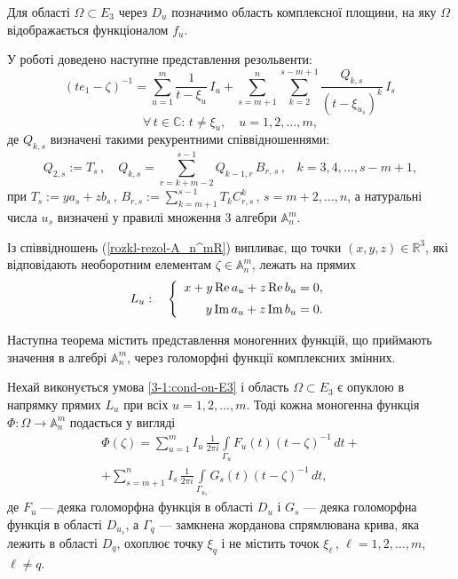 \documentclass[11pt, reqno]{amsart}
\begin{document}
Для області
$\Omega\subset E_3$ через $D_u$ позначимо область комплексної
площини, на яку $\Omega$ відображається функціоналом $f_u$.

У роботі \cite{Sh-co} доведено наступне представлення резольвенти:
\begin{equation}\label{rozkl-rezol-A_n^mR}
(te_1-\zeta)^{-1}=\sum\limits_{u=1}^m\frac{1}{t-\xi_u}\,I_u+
 \sum\limits_{s=m+1}^{n}\sum\limits_{k=2}^{s-m+1}\frac{Q_{k,s}}
 {\left(t-\xi_{u_{s}}\right)^k}\,I_{s}\,
  \end{equation}
  $$ \forall\,t\in\mathbb{C}:\,
t\neq \xi_u,\quad u=1,2,\ldots,m,$$ де $Q_{k,s}$ визначені такими
рекурентними співвідношеннями:
$$
Q_{2,s}:=T_{s}\,,\quad
Q_{k,s}=\sum\limits_{r=k+m-2}^{s-1}Q_{k-1,r}\,B_{r,\,s}\,,\;
\;\;k=3,4,\ldots,s-m+1,
$$
при
$T_s:=ya_s+zb_s$\,, $B_{r,s}:=\sum\limits_{k=m+1}^{s-1}T_k
C_{r,s}^k$\,, $s=m+2,\ldots,n$,
 а натуральні числа $u_s$  визначені у правилі множення 3 алгебри $\mathbb{A}_n^m$.

Із співвідношень  (\ref{rozkl-rezol-A_n^mR}) випливає, що точки
 $(x,y,z)\in\mathbb{R}^3$, які відповідають необоротним елементам
 $\zeta\in\mathbb{A}_n^m$, лежать на прямих
\begin{equation}\label{3-2:L-uR}
 L_u:\quad\left\{
\begin{array}{r}x+y\,{\rm Re}\,a_u+z\,{\rm Re}\,b_u=0,\vspace*{2mm} \\
y\,{\rm Im}\,a_u+z\,{\rm Im}\,b_u=0. \\
\end{array} \right.
\end{equation}


Наступна теорема містить представлення моногенних функцій, що
приймають значення в алгебрі $\mathbb{A}_n^m$, через голоморфні
функції комплексних змінних.

\vskip 1mm

\begin{theorem}[\cite{Sh-co}] \label{Shpak-costr-op} 
Нехай виконується умова \eqref{3-1:cond-on-E3} і
область
$\Omega\subset E_3$ є опуклою в напрямку прямих $L_u$ при всіх
 $u=1,2,\ldots, m$.
Тоді кожна моногенна функція
$\Phi:\Omega\rightarrow\mathbb{A}_n^m$ подається у вигляді
\begin{multline}
  \label{Teor--1RR}
\Phi(\zeta)=\sum\limits_{u=1}^mI_u\,\frac{1}{2\pi
i}\int\limits_{\Gamma_u} F_u(t)(t-\zeta)^{-1}\,dt+\\
+\sum\limits_{s=m+1}^nI_s\,\frac{1}{2\pi i}\int\limits_
{\Gamma_{u_s}}G_s(t)(t-\zeta)^{-1}\,dt,
\end{multline}
де $F_u$ --- деяка голоморфна функція в області $D_u$ і $G_s$ ---
 деяка голоморфна функція
в області $D_{u_s}$, а $\Gamma_q$ --- замкнена жорданова
спрямлювана крива, яка лежить в області $D_q$, охоплює  точку
$\xi_q$ і не містить точок $\xi_{\ell}$\,, $\ell=1,2,\ldots,
m$,\,$\ell\neq q$. 
\end{theorem}
\end{document}
